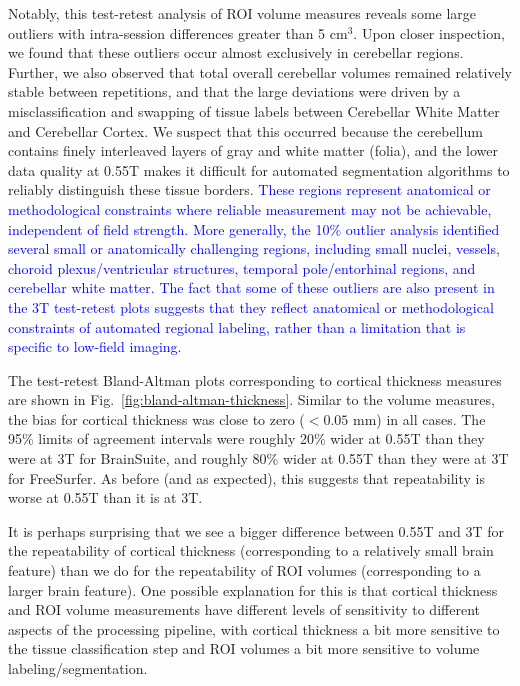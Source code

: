 \documentclass[12pt,letterpaper,onecolumn]{article}
\newcommand{\mycomment}[1]
{\todo[caption={#1},color=red!100!green!33,noline]{\color{black} \begin{spacing}{0.5}#1\vspace{-0.5em}\end{spacing}}}
\begin{document}
{\color{.}Notably, this test-retest analysis of ROI volume measures reveals some large outliers with intra-session differences greater than 5 cm$^3$.  Upon closer inspection, we found that these outliers occur almost exclusively in cerebellar regions.  Further, we also observed that total overall cerebellar volumes remained relatively stable between repetitions, and that the large deviations were driven by a misclassification and swapping of tissue labels between Cerebellar White Matter and Cerebellar Cortex. We suspect that this occurred because the cerebellum contains finely interleaved layers of gray and white matter (folia), and the lower data quality at 0.55T makes it difficult for automated segmentation algorithms to reliably distinguish these tissue borders.} \textcolor{blue}{These regions represent anatomical or methodological constraints where reliable measurement may not be achievable, independent of field strength.\mycomment{R1.3}} \textcolor{blue}{More generally, the 10\% outlier analysis identified several small or anatomically challenging regions, including small nuclei, vessels, choroid plexus/ventricular structures, temporal pole/entorhinal regions, and cerebellar white matter. The fact that some of these outliers are also present in the 3T test-retest plots suggests that they reflect anatomical or methodological constraints of automated regional labeling, rather than a limitation that is specific to low-field imaging.\mycomment{R1.3}}

The test-retest Bland-Altman plots corresponding to cortical thickness measures are shown in Fig.~\ref{fig:bland-altman-thickness}. Similar to the volume measures, the bias for cortical thickness was close to zero ($< 0.05$ mm) in all cases.   The 95\% limits of agreement intervals were roughly 20\% wider at 0.55T than they were at 3T for BrainSuite, and roughly 80\% wider at 0.55T than they were at 3T for FreeSurfer.  As before (and as expected), this suggests that repeatability is worse at 0.55T than it is at 3T. 

It is perhaps surprising that we see a bigger difference between 0.55T and 3T for the repeatability of cortical thickness (corresponding to a relatively small brain feature) than we do for the repeatability of ROI volumes (corresponding to a larger brain feature).  One possible explanation for this is that cortical thickness and ROI volume measurements have different levels of sensitivity to different aspects of the processing pipeline, with cortical thickness a bit more sensitive to the tissue classification step and ROI volumes a bit more sensitive to volume labeling/segmentation.   
\end{document}
